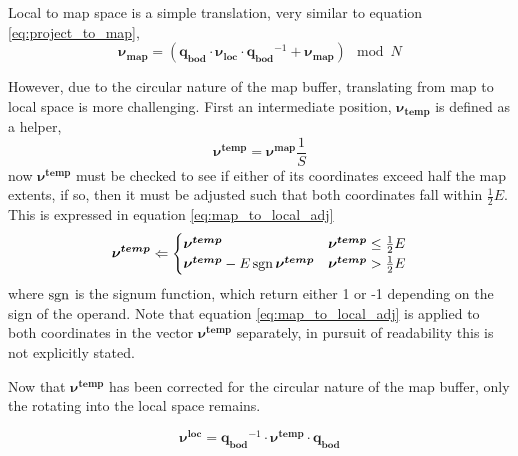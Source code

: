         Local to map space is a simple translation, very similar to equation \ref{eq:project_to_map},
        \begin{equation} \label{eq:local_to_map}
            \boldsymbol{\nu_{map}} = (\boldsymbol{q_{bod}} \cdot \boldsymbol{\nu_{loc}} \cdot \boldsymbol{q_{bod}}^{-1} + \boldsymbol{\nu_{map}}) \mod N
        \end{equation}

        However, due to the circular nature of the map buffer, translating from map to local space is more challenging. First an intermediate position, \(\boldsymbol{\nu_{temp}}\) is defined as a helper,
        \begin{equation} \label{eq:map_to_local_help}
            \boldsymbol{\nu^{temp}} = \boldsymbol{\nu^{map}}\frac{1}{S}
        \end{equation}
        now \(\boldsymbol{\nu^{temp}}\) must be checked to see if either of its coordinates exceed half the map extents, if so, then it must be adjusted such that both coordinates fall within \(\frac{1}{2}E\).
        This is expressed in equation \ref{eq:map_to_local_adj}
        \begin{equation} \label{eq:map_to_local_adj}
            \boldsymbol{\nu^{temp}} \Leftarrow 
            \begin{cases}
                \boldsymbol{\nu^{temp}} & \boldsymbol{\nu^{temp}} \leq \frac{1}{2}E \\
                \boldsymbol{\nu^{temp}} - E\operatorname{\boldsymbol{sgn}} \boldsymbol{\nu^{temp}} & \boldsymbol{\nu^{temp}} > \frac{1}{2}E
            \end{cases}
        \end{equation}
        where \(\operatorname{\boldsymbol{sgn}}\) is the signum function, which return either 1 or -1 depending on the sign of the operand.
        Note that equation \ref{eq:map_to_local_adj} is applied to both coordinates in the vector \(\boldsymbol{\nu^{temp}}\) separately, in pursuit of readability this is not explicitly stated.

        Now that \(\boldsymbol{\nu^{temp}}\) has been corrected for the circular nature of the map buffer, only the rotating into the local space remains.

        \begin{equation} \label{eq:map_to_local_rot}
            \boldsymbol{\nu^{loc}} = \boldsymbol{q_{bod}}^{-1} \cdot \boldsymbol{\nu^{temp}} \cdot \boldsymbol{q_{bod}}
        \end{equation}


